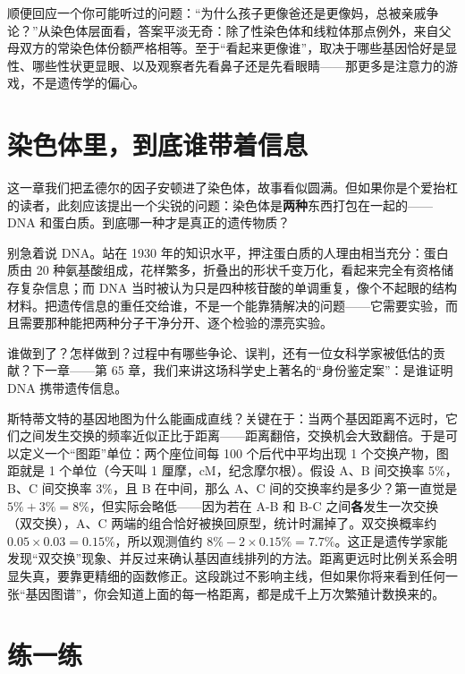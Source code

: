 顺便回应一个你可能听过的问题：“为什么孩子更像爸还是更像妈，总被亲戚争论？”从染色体层面看，答案平淡无奇：除了性染色体和线粒体那点例外，来自父母双方的常染色体份额严格相等。至于“看起来更像谁”，取决于哪些基因恰好是显性、哪些性状更显眼、以及观察者先看鼻子还是先看眼睛——那更多是注意力的游戏，不是遗传学的偏心。

\section{染色体里，到底谁带着信息}

这一章我们把孟德尔的因子安顿进了染色体，故事看似圆满。但如果你是个爱抬杠的读者，此刻应该提出一个尖锐的问题：染色体是\textbf{两种}东西打包在一起的——DNA 和蛋白质。到底哪一种才是真正的遗传物质？

别急着说 DNA。站在 1930 年的知识水平，押注蛋白质的人理由相当充分：蛋白质由 20 种氨基酸组成，花样繁多，折叠出的形状千变万化，看起来完全有资格储存复杂信息；而 DNA 当时被认为只是四种核苷酸的单调重复，像个不起眼的结构材料。把遗传信息的重任交给谁，不是一个能靠猜解决的问题——它需要实验，而且需要那种能把两种分子干净分开、逐个检验的漂亮实验。

谁做到了？怎样做到？过程中有哪些争论、误判，还有一位女科学家被低估的贡献？下一章——第 65 章，我们来讲这场科学史上著名的“身份鉴定案”：是谁证明 DNA 携带遗传信息。

\begin{tiaozhan}
斯特蒂文特的基因地图为什么能画成直线？关键在于：当两个基因距离不远时，它们之间发生交换的频率近似正比于距离——距离翻倍，交换机会大致翻倍。于是可以定义一个“图距”单位：两个座位间每 100 个后代中平均出现 1 个交换产物，图距就是 1 个单位（今天叫 1 厘摩，cM，纪念摩尔根）。假设 A、B 间交换率 5\%，B、C 间交换率 3\%，且 B 在中间，那么 A、C 间的交换率约是多少？第一直觉是 $5\%+3\%=8\%$，但实际会略低——因为若在 A-B 和 B-C 之间\textbf{各}发生一次交换（双交换），A、C 两端的组合恰好被换回原型，统计时漏掉了。双交换概率约 $0.05 \times 0.03 = 0.15\%$，所以观测值约 $8\% - 2\times0.15\% = 7.7\%$。这正是遗传学家能发现“双交换”现象、并反过来确认基因直线排列的方法。距离更远时比例关系会明显失真，要靠更精细的函数修正。这段跳过不影响主线，但如果你将来看到任何一张“基因图谱”，你会知道上面的每一格距离，都是成千上万次繁殖计数换来的。
\end{tiaozhan}

\section*{练一练}

